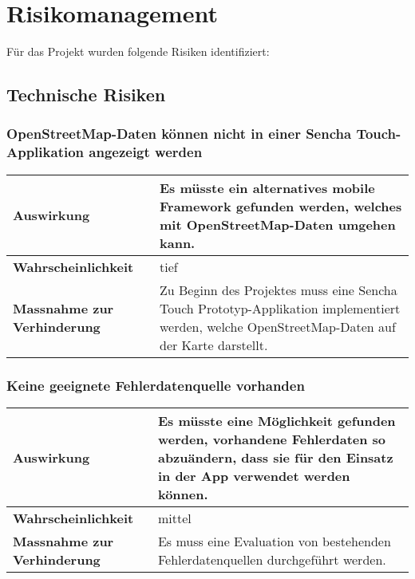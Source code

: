 \section{Risikomanagement}
\label{risikomanagement}

Für das Projekt wurden folgende Risiken identifiziert:
\subsection{Technische Risiken}

\subsubsection{OpenStreetMap-Daten können nicht in einer Sencha Touch-Applikation angezeigt werden}
\begin{table}[H]
\centering
\begin{tabular}{|p{0.25\twocelltabwidth}|p{0.75\twocelltabwidth}|}
\hline 
\small{\textbf{Auswirkung}} & Es müsste ein alternatives mobile Framework gefunden werden, welches mit OpenStreetMap-Daten umgehen kann. \\
\hline 
\small{\textbf{Wahrscheinlichkeit}} & tief \\
\hline 
\small{\textbf{Massnahme zur Verhinderung}} & Zu Beginn des Projektes muss eine Sencha Touch Prototyp-Applikation implementiert werden, welche OpenStreetMap-Daten auf der Karte darstellt. \\
\hline
\end{tabular}
\end{table}

\subsubsection{Keine geeignete Fehlerdatenquelle vorhanden}
\begin{table}[H]
\centering
\begin{tabular}{|p{0.25\twocelltabwidth}|p{0.75\twocelltabwidth}|}
\hline 
\small{\textbf{Auswirkung}} & Es müsste eine Möglichkeit gefunden werden, vorhandene Fehlerdaten so abzuändern, dass sie für den Einsatz in der App verwendet werden können. \\
\hline 
\small{\textbf{Wahrscheinlichkeit}} & mittel \\
\hline 
\small{\textbf{Massnahme zur Verhinderung}} & Es muss eine Evaluation von bestehenden Fehlerdatenquellen durchgeführt werden. \\
\hline
\end{tabular}
\end{table}

